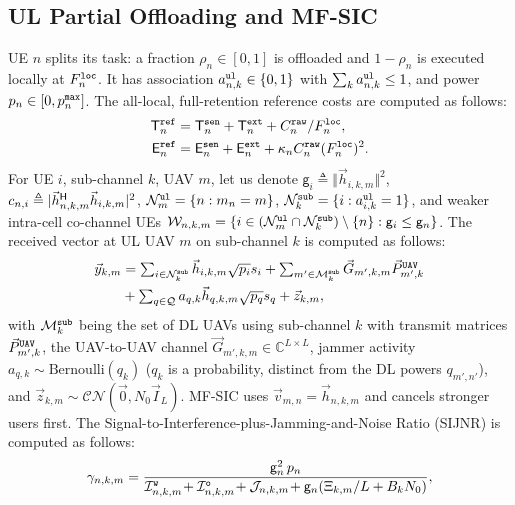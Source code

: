 \documentclass[journal]{IEEEtran}
\begin{document}
\subsection{UL Partial Offloading and MF-SIC}
\label{sec:ul}
UE $n$ splits its task: a fraction $\rho_n\in[0,1]$ is offloaded and $1-\rho_n$ is executed locally at $F_n^{\tt loc}$. It has association $a_{n,k}^{\tt ul}\in\{0,1\}$ with $\sum_k a_{n,k}^{\tt ul}\le 1$, and power $p_n\in[0,p_n^{\tt max}]$. The all-local, full-retention reference costs are computed as follows:
\begin{align}
\mathsf{T}_n^{\tt ref}&=\mathsf{T}_n^{\tt sen}+\mathsf{T}_n^{\tt ext}+C_n^{\tt raw}/F_n^{\tt loc},
\label{eq:ref}\\
\mathsf{E}_n^{\tt ref}&=\mathsf{E}_n^{\tt sen}+\mathsf{E}_n^{\tt ext}+\kappa_n C_n^{\tt raw}(F_n^{\tt loc})^2 .
\nonumber
\end{align}
For UE $i$, sub-channel $k$, UAV $m$, let us denote $\mathsf{g}_i\triangleq\Vert\vec{h}_{i,k,m}\Vert^2$, $c_{n,i}\triangleq|\vec{h}_{n,k,m}^{\sf H}\vec{h}_{i,k,m}|^2$, 
$\mathcal{N}_m^{\tt ul}=\{n:m_n=m\}$,
$\mathcal{N}_k^{\tt sub}=\{i:a_{i,k}^{\tt ul}=1\}$, and weaker intra-cell co-channel UEs $\mathcal{W}_{n,k,m}=\{i\in(\mathcal{N}_m^{\tt ul}\cap\mathcal{N}_k^{\tt sub})\setminus\{n\}:\mathsf{g}_i\le\mathsf{g}_n\}$.
The received vector at UL UAV $m$ on sub-channel $k$ is computed as follows:
\begin{equation}
\begin{aligned}
\textstyle\vec{y}_{k,m}&=\textstyle\sum_{i\in\mathcal{N}_k^{\tt sub}}\vec{h}_{i,k,m}\sqrt{p_i}s_i+\sum_{m'\in\mathcal{M}_k^{\tt sub}}\vec{G}_{m',k,m}\vec{P}_{m',k}^{\tt UAV}\\
&\textstyle+\sum_{q\in\mathcal{Q}}a_{q,k}\vec{h}_{q,k,m}\sqrt{p_q}s_q+\vec{z}_{k,m},
\end{aligned}
\label{eq:ul_y}
\end{equation}
with $\mathcal{M}_k^{\tt sub}$ being the set of DL UAVs using sub-channel $k$ with transmit matrices $\vec{P}_{m',k}^{\tt UAV}$, the UAV-to-UAV channel $\vec{G}_{m',k,m}\in\mathbb{C}^{L\times L}$, jammer activity $a_{q,k}\sim\mathrm{Bernoulli}(q_k)$ ($q_k$ is a probability, distinct from the DL powers $q_{m',n'}$), and $\vec{z}_{k,m}\sim\mathcal{CN}(\vec{0},N_0\vec{I}_L)$. MF-SIC uses $\vec{v}_{m,n}=\vec{h}_{n,k,m}$ and cancels stronger users first. The Signal-to-Interference-plus-Jamming-and-Noise Ratio (SIJNR) is computed as follows:
\begin{equation}
\gamma_{n,k,m}
=\frac{\mathsf{g}_n^2\, p_n}
{\mathcal{I}_{n,k,m}^{\tt w}\!+\mathcal{I}_{n,k,m}^{\tt o}\!+\mathcal{J}_{n,k,m}
\!+\mathsf{g}_n(\Xi_{k,m}/L+B_kN_0)},
\label{eq:ul_sijnr}
\end{equation}
\end{document}
